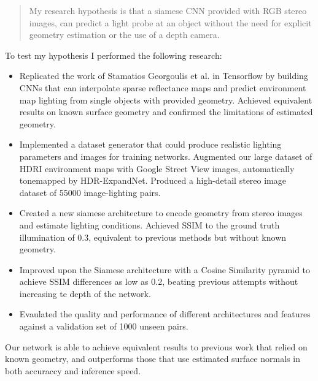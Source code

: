 \documentclass[ %
                    author={Gavin Parker},
                supervisor={Dr. Neill Campbell},
                    degree={MEng},
                     title={Deep Siamese Networks for Illumination Estimation from Stereo Images},
                  subtitle={},
                      type={research},
                      year={2018} ]{dissertation}
\begin{document}
\begin{quote}
My research hypothesis is that a siamese CNN provided with RGB stereo images, can predict a light probe at an object without the need for explicit geometry estimation or the use of a depth camera.
\end{quote}

To test my hypothesis I performed the following research:

\noindent
\begin{itemize}
\item Replicated the work of Stamatios Georgoulis et al. in Tensorflow by building CNNs that can interpolate sparse reflectance maps and predict environment map lighting from single objects with provided geometry. Achieved equivalent results on known surface geometry and confirmed the limitations of estimated geometry.
\item Implemented a dataset generator that could produce realistic lighting parameters and images for training networks. Augmented our large dataset of HDRI environment maps with Google Street View images, automatically tonemapped by HDR-ExpandNet. Produced a high-detail stereo image dataset of 55000 image-lighting pairs.
\item Created a new siamese architecture to encode geometry from stereo images and estimate lighting conditions. Achieved SSIM to the ground truth illumination of 0.3, equivalent to previous methods but without known geometry.
\item Improved upon the Siamese architecture with a Cosine Similarity pyramid to achieve SSIM differences as low as 0.2, beating previous attempts without increasing te depth of the network.
\item Evaulated the quality and performance of different architectures and features against a validation set of 1000 unseen pairs.
\end{itemize}

Our network is able to achieve equivalent results to previous work that relied on known geometry, and outperforms those that use estimated surface normals in both accuraccy and inference speed.


\tableofcontents
\end{document}
